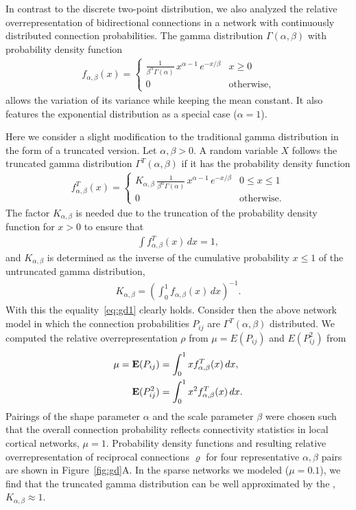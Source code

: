 
In contrast to the discrete two-point distribution, we also analyzed the relative overrepresentation of bidirectional connections in a network with continuously distributed connection probabilities. The gamma distribution $\Gamma(\alpha, \beta)$ with probability density function
\begin{align}
    f_{\alpha,\beta}(x) = \begin{cases} 
\frac{1}{\beta^{\alpha}\Gamma(\alpha)}\, x^{\alpha-1}\,e^{-x/\beta} & x \geq 0 \\
0 & \text{otherwise},
\end{cases}
\end{align}
allows the variation of its variance while keeping the mean constant. It also features the exponential distribution as a special case ($\alpha=1$).

Here we consider a slight modification to the traditional gamma distribution in the form of a truncated version. Let $\alpha, \beta > 0$. A random variable $X$ follows the truncated gamma distribution $\Gamma^T(\alpha, \beta)$ if it has the probability density function 
%
\begin{align}
  f_{\alpha,\beta}^T(x) = \begin{cases} K_{\alpha, \beta}\,
\frac{1}{\beta^{\alpha}\Gamma(\alpha)}\, x^{\alpha-1}\,e^{-x/\beta} & 0 \leq x \leq 1 \\
0 & \text{otherwise}.
\end{cases}
\end{align}
%
The factor $K_{\alpha,\beta}$ is needed due to the truncation of the probability density function for $x>0$ to ensure that
\begin{align}
  \int f_{\alpha,\beta}^T(x) \,dx = 1 \label{eq:gd1},
\end{align}
and $K_{\alpha,\beta}$ is determined as the inverse of the cumulative probability $x \leq 1$ of the untruncated gamma distribution,
\begin{align}
  K_{\alpha,\beta} = \left(\int_0^{1} f_{\alpha,\beta}(x) \, dx \right)^{-1}.
\end{align}
With this the equality~\eqref{eq:gd1} clearly holds. Consider then the above network model in which the connection probabilities $P_{ij}$ are $\Gamma^T(\alpha, \beta)$ distributed. We computed the relative overrepresentation $\rho$ from $\mu = E(P_{ij})$ and $E(P_{ij}^2)$ from
\begin{align}
  \mu = \operatorname{\mathbf{E}}(P_{ij}) &= \int_0^1 x f_{\alpha,\beta}^T(x)\, dx,\\
        \operatorname{\mathbf{E}}(P_{ij}^2) &= \int_0^1 x^2 f_{\alpha,\beta}^T(x)\, dx.
\end{align}
Pairings of the shape parameter $\alpha$ and the scale parameter $\beta$ were chosen such that the overall connection probability reflects connectivity statistics in local cortical networks, $\mu = 1$. Probability density functions and resulting relative overrepresentation of reciprocal connections $\varrho$ for four representative $\alpha,\beta$ pairs are shown in Figure~\ref{fig:gd}A. In the sparse networks we modeled ($\mu = 0.1$), we find that the truncated gamma distribution can be well approximated by the , $K_{\alpha, \beta} \approx 1$.

